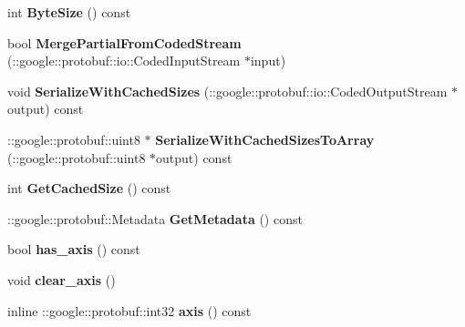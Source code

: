\begin{DoxyCompactItemize}
\mbox{\label{classcaffe_1_1_bias_parameter_aae108b33f6e7559d46aa4ea4caa800a6}} 
int {\bfseries Byte\+Size} () const
\item 
\mbox{\label{classcaffe_1_1_bias_parameter_ad4247ab47d988149636aaac0961cb8e4}} 
bool {\bfseries Merge\+Partial\+From\+Coded\+Stream} (\+::google\+::protobuf\+::io\+::\+Coded\+Input\+Stream $\ast$input)
\item 
\mbox{\label{classcaffe_1_1_bias_parameter_ad0c41127520d0c27c12177a0a12f350f}} 
void {\bfseries Serialize\+With\+Cached\+Sizes} (\+::google\+::protobuf\+::io\+::\+Coded\+Output\+Stream $\ast$output) const
\item 
\mbox{\label{classcaffe_1_1_bias_parameter_ac4fb24cf9fb460f481d349ebf9b8edb1}} 
\+::google\+::protobuf\+::uint8 $\ast$ {\bfseries Serialize\+With\+Cached\+Sizes\+To\+Array} (\+::google\+::protobuf\+::uint8 $\ast$output) const
\item 
\mbox{\label{classcaffe_1_1_bias_parameter_a155ade9577cc26653f6705d9f9c55012}} 
int {\bfseries Get\+Cached\+Size} () const
\item 
\mbox{\label{classcaffe_1_1_bias_parameter_a15920e135a0df6fe958833ad9438f253}} 
\+::google\+::protobuf\+::\+Metadata {\bfseries Get\+Metadata} () const
\item 
\mbox{\label{classcaffe_1_1_bias_parameter_ad9d903a3e139c81c46b9dc972886627a}} 
bool {\bfseries has\+\_\+axis} () const
\item 
\mbox{\label{classcaffe_1_1_bias_parameter_a82f950568ee96ddff90b7068659f2a6c}} 
void {\bfseries clear\+\_\+axis} ()
\item 
\mbox{\label{classcaffe_1_1_bias_parameter_a4ac86d95440a04b5b61ede3019fabe88}} 
inline \+::google\+::protobuf\+::int32 {\bfseries axis} () const
\item 
\mbox{\label{classcaffe_1_1_bias_parameter_a7139c7f0c2272974ac042c0b0740c5a4}} 

\end{DoxyCompactItemize}
